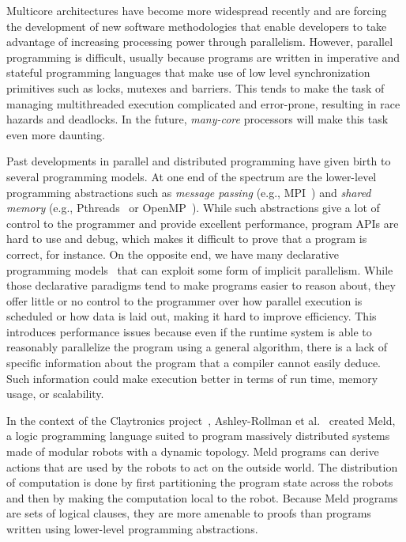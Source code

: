 Multicore architectures have become more widespread recently and are forcing the
development of new software methodologies that enable developers to take
advantage of increasing processing power through parallelism. However, parallel
programming is difficult, usually because programs are written in imperative and
stateful programming languages that make use of low level synchronization
primitives such as locks, mutexes and barriers. This tends to make the task of
managing multithreaded execution complicated and error-prone, resulting in race
hazards and deadlocks. In the future, \emph{many-core} processors will make this
task even more daunting.

Past developments in parallel and distributed programming have given birth to
several programming models. At one end of the spectrum are the lower-level
programming abstractions such as \emph{message passing} (e.g.,
MPI~\cite{gabriel04-open-mpi}) and \emph{shared memory} (e.g.,
Pthreads~\cite{Butenhof:1997:PPT:263953} or
OpenMP~\cite{Chapman-2007-UOP-1370966}). While such abstractions give a lot of
control to the programmer and provide excellent performance, program APIs are
hard to use and debug, which makes it difficult to prove that a program is
correct, for instance. On the opposite end, we have many declarative programming
models~\cite{Blelloch:1996:PPA:227234.227246} that can exploit some form of
implicit parallelism.  While those declarative paradigms tend to make programs
easier to reason about, they offer little or no control to the programmer over
how parallel execution is scheduled or how data is laid out, making it hard to
improve efficiency. This introduces performance issues because even if the
runtime system is able to reasonably parallelize the program using a general
algorithm, there is a lack of specific information about the program that a
compiler cannot easily deduce. Such information could make execution better in
terms of run time, memory usage, or scalability.

In the context of the Claytronics project~\cite{goldstein-computer05},
Ashley-Rollman et al.~\cite{ashley-rollman-iclp09,
ashley-rollman-derosa-iros07wksp} created Meld, a logic programming language
suited to program massively distributed systems made of modular robots with a
dynamic topology. Meld programs can derive actions that are used by the
robots to act on the outside world. The distribution of computation is done by
first partitioning the program state across the robots and then by making the
computation local to the robot. Because Meld programs are sets of logical
clauses, they are more amenable to proofs than programs written using
lower-level programming abstractions.

